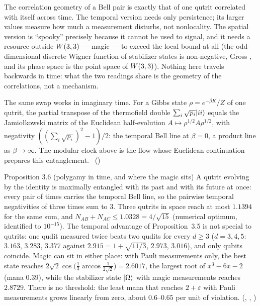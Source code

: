 \begin{physical}
The correlation geometry of a Bell pair is exactly that of one qutrit correlated with itself across time. The temporal
version needs only persistence; its larger values measure how much a measurement disturbs, not nonlocality. The
spatial version is ``spooky'' precisely because it cannot be used to signal, and it needs a resource outside $W(3,3)$ ---
magic --- to exceed the local bound at all (the odd-dimensional discrete Wigner function of stabilizer states is
non-negative, Gross \cite{Gross2006}, and its phase space is the point space of $W(3,3)$). Nothing here travels backwards in
time: what the two readings share is the geometry of the correlations, not a mechanism.
\end{physical}

The same swap works in imaginary time. For a Gibbs state $\rho=e^{-\beta K}/Z$ of one qutrit, the partial transpose of
the thermofield double $\sum_i\sqrt{p_i}\lvert ii\rangle$ equals the Jamio{\l}kowski matrix of the Euclidean half-evolution
$A\mapsto\rho^{1/2}A\rho^{1/2}$, with negativity $((\sum_i\sqrt{p_i})^2-1)/2$: the temporal Bell line at $\beta=0$, a
product line as $\beta\to\infty$. The modular clock above is the flow whose Euclidean continuation prepares this
entanglement. \tierC\ ()

\begin{result}{Proposition 3.6 (polygamy in time, and where the magic sits) \hfill \tierC}
A qutrit evolving by the identity is maximally entangled with its past and with its future at once: every pair of times
carries the temporal Bell line, so the pairwise temporal negativities of three times sum to $3$. Three qutrits in space
reach at most $1.1394$ for the same sum, and $N_{AB}+N_{AC}\le 1.0328=4/\sqrt{15}$ (numerical optimum, identified to
$10^{-15}$). The temporal advantage of Proposition~3.5 is not special to qutrits: one qudit measured twice beats two
qudits for every $d\ge3$ ($d=3,4,5$: $3.163$, $3.283$, $3.377$ against $2.915=1+\sqrt{11/3}$, $2.973$, $3.016$),
and only qubits coincide. Magic can sit in either place: with Pauli measurements only, the best state reaches
$2\sqrt2\cos\!\bigl(\tfrac13\arccos\tfrac1{2\sqrt2}\bigr)=2.6017$, the largest root of $x^3-6x-2$ (mana $0.39$), while
the stabilizer state $\lvert \Omega\rangle$ with magic measurements reaches $2.8729$. There is no threshold: the least mana that reaches $2+\varepsilon$ with Pauli measurements grows linearly from zero, about $0.6$--$0.65$ per unit of violation. \tierC
(, ,
)
\end{result}


